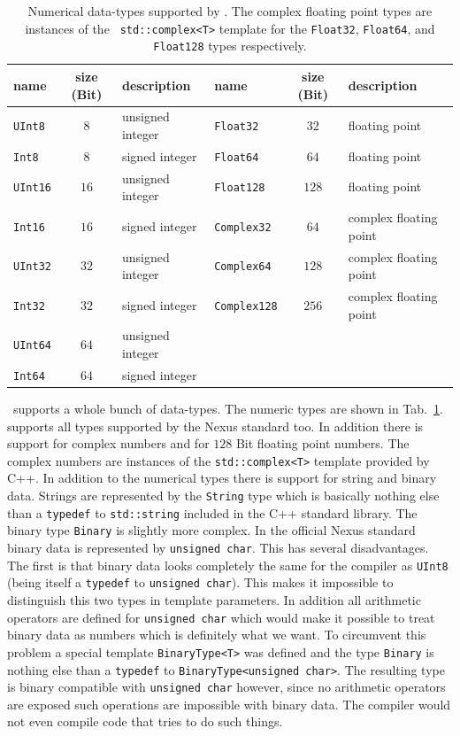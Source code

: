 \begin{table}[tb]
\centering
\begin{tabular}{l|c|l||l|c|l}
 name & size (Bit) & description & name & size (Bit) & description \\
 \hline
 {\tt UInt8} & $8$ & unsigned integer & {\tt Float32} & $32$ & floating point \\
 {\tt Int8}  & $8$ & signed integer &   {\tt Float64} & $64$ & floating point \\
 {\tt UInt16} & $16$ & unsigned integer & {\tt Float128} & $128$ & floating
 point\\
 {\tt Int16} & $16$ & signed integer & {\tt Complex32} & $64$ & complex floating
 point \\
 {\tt UInt32} & $32$ & unsigned integer & {\tt Complex64} & $128$ & complex
 floating point \\
 {\tt Int32} & $32$ & signed integer & {\tt Complex128} & $256$ & complex
 floating point \\
 {\tt UInt64} & $64$ & unsigned integer & & & \\
 {\tt Int64} & $64$ & signed integer & & & \\
\hline
\end{tabular}
\caption{{\small\label{tab:numeric_types} Numerical data-types supported by
\pninx. The complex floating point types are instances of the {\tt
std::complex<T>} template for the  {\tt Float32}, {\tt Float64}, and {\tt
Float128} types respectively.}}
\end{table}

\pninx\ supports a whole bunch of data-types. The numeric types are shown in 
Tab.~\ref{tab:numeric_types}. \pninx supports all types supported by the Nexus
standard too. In addition there is support for complex numbers and for $128$ Bit
floating point numbers. The complex numbers are instances of the 
{\tt std::complex<T>} template provided by C++.
In addition to the numerical types there is support for string and binary data. 
Strings are represented by the {\tt String} type which is basically nothing else
than a {\tt typedef} to {\tt std::string} included in the C++ standard library.
The binary type {\tt Binary} is slightly more complex. In the official Nexus
standard binary data is represented by {\tt unsigned char}. This has several 
disadvantages. The first is that binary data looks completely the same 
for the compiler as {\tt UInt8} (being itself a {\tt typedef} to {\tt unsigned
char}). This makes it impossible to distinguish this two types in template
parameters. In addition all arithmetic operators are defined for {\tt unsigned
char} which would make it possible to treat binary data as numbers which is
definitely what we want. To circumvent this problem a special template 
{\tt BinaryType<T>} was defined and the type {\tt Binary} is nothing else 
than a {\tt typedef} to {\tt BinaryType<unsigned char>}. The resulting type is
binary compatible with {\tt unsigned char} however, since no arithmetic
operators are exposed such operations are impossible with binary data. 
The compiler would not even compile code that tries to do such things. 


